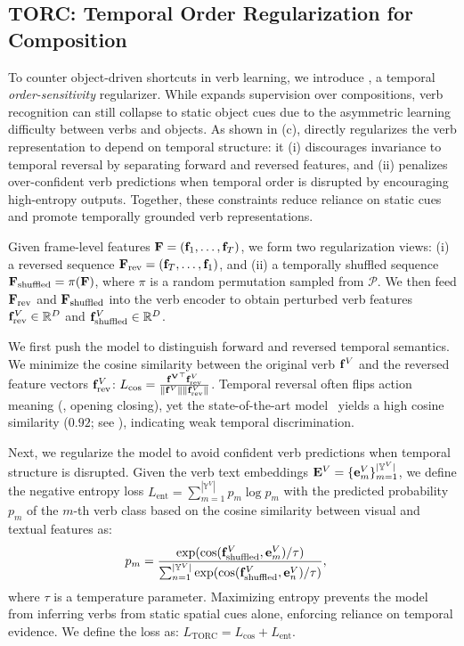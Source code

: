 \subsection{TORC: Temporal Order Regularization for Composition}

To counter object-driven shortcuts in verb learning, we introduce \torc{}, a temporal \emph{order-sensitivity} regularizer.
While \cpr{} expands supervision over compositions, verb recognition can still collapse to static object cues due to the asymmetric learning difficulty between verbs and objects.
As shown in  (c), \torc{} directly regularizes the verb representation to depend on temporal structure: it (i) discourages invariance to temporal reversal by separating forward and reversed features, and (ii) penalizes over-confident verb predictions when temporal order is disrupted by encouraging high-entropy outputs.
Together, these constraints reduce reliance on static cues and promote temporally grounded verb representations.



Given frame-level features $\mathbf{F} = (\mathbf{f}_1,\dots,\mathbf{f}_T)$, we form two regularization views:  
(i) a reversed sequence $\mathbf{F}_{\text{rev}} = (\mathbf{f}_T,\dots,\mathbf{f}_1)$, and  
(ii) a temporally shuffled sequence $\mathbf{F}_{\text{shuffled}} = \pi(\mathbf{F})$, where $\pi$ is a random permutation sampled from $\mathcal{P}$.  
We then feed $\mathbf{F}_{\text{rev}}$ and $\mathbf{F}_{\text{shuffled}}$ into the verb encoder to obtain perturbed verb features $\mathbf{f}^V_\text{rev}\in \mathbb{R}^{D}$ and $\mathbf{f}^V_\text{shuffled} \in \mathbb{R}^{D}$. 



We first push the model to distinguish forward and reversed temporal semantics.  
We minimize the cosine similarity between the original verb $\mathbf{f}^V$ and the reversed feature vectors $\mathbf{f}^V_{\text{rev}}$: $L_{\cos} = \frac{\mathbf{f^V}^\top\mathbf{f}^V_{\text{rev}}}{\|\mathbf{f}^V\|\|\mathbf{f}^V_{\text{rev}}\|}$.
Temporal reversal often flips action meaning (\eg, opening \vs closing), yet the state-of-the-art model~\cite{li2024c2c} yields a high cosine similarity ($0.92$; see ), indicating weak temporal discrimination.




Next, we regularize the model to avoid confident verb predictions when temporal structure is disrupted.  
Given the verb text embeddings $\mathbf{E}^V = \{\mathbf{e}^V_m\}_{m=1}^{|\mathbb{Y}^V|}$, we define the negative entropy loss $L_\text{ent} = \sum_{m=1}^{|\mathbb{Y}^V|} p_m \log p_m$ with the predicted probability $p_m$ of the $m$-th verb class based on the cosine similarity between visual and textual features as:
\begin{align}
    p_m &= \frac{\exp(\cos(\mathbf{f}^V_\text{shuffled}, \mathbf{e}^V_m) / \tau)}{\sum_{n=1}^{|\mathbb{Y}^V|} \exp(\cos(\mathbf{f}^V_\text{shuffled}, \mathbf{e}^V_n) / \tau)},
\label{eq:ent}
\end{align}
where $\tau$ is a temperature parameter.
Maximizing entropy prevents the model from inferring verbs from static spatial cues alone, enforcing reliance on temporal evidence.
We define the \torc{} loss as: $L_{\text{TORC}} = L_{\cos} + L_{\text{ent}}$.


